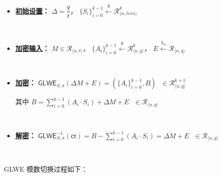 \begin{itemize}
\item \textbf{\underline{初始设置}：} $\Delta = \dfrac{q}{t}$，\text{ } $\{S_i\}_{i=0}^{k-1} \xleftarrow{\$} \mathcal{R}_{\langle n, \textit{tern} \rangle}^k$

$ $

\item \textbf{\underline{加密输入}：} $M \in \mathcal{R}_{\langle n, t \rangle}$，\text{ } $\{A_i\}_{i=0}^{k-1} \xleftarrow{\$} \mathcal{R}_{\langle n,q \rangle}^{k}$，\text{ } $E \xleftarrow{\chi_\sigma} \mathcal{R}_{\langle n,q \rangle}$

$ $

\item \textbf{\underline{加密}：} $\textsf{GLWE}_{S,\sigma}(\Delta M + E) = (\{A_i\}_{i=0}^{k-1}, B) \text{ } \in \mathcal{R}_{\langle n,q \rangle}^{k + 1}$

其中 $B = \sum\limits_{i=0}^{k-1}{(A_i \cdot S_i)} + \Delta  M + E \text{ } \in \mathcal{R}_{\langle n,q \rangle}$

$ $

\item \textbf{\underline{解密}：} $\textsf{GLWE}^{-1}_{S,\sigma}(\textsf{ct}) = B - \sum\limits_{i=0}^{k-1}{(A_i \cdot S_i)} = \Delta  M + E \text{ } \in \mathcal{R}_{\langle n,q \rangle}$

\end{itemize}

$ $

GLWE 模数切换过程如下：

